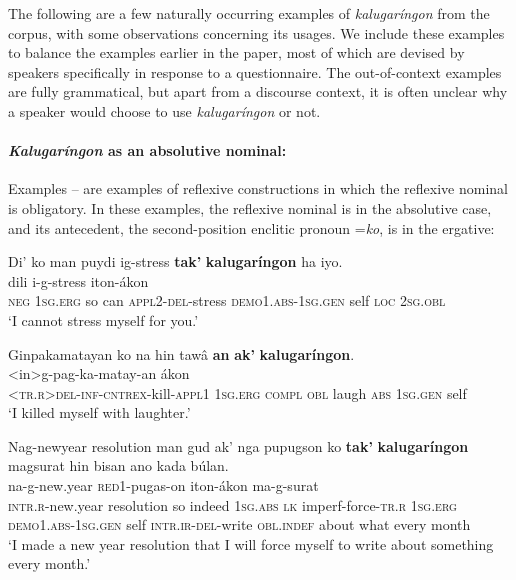 \documentclass[output=paper]{langscibook}
\begin{document}
The following are a few naturally occurring examples of \textit{kalugaríngon} from the corpus, with some observations concerning its usages. We include these examples to balance the examples earlier in the paper, most of which are devised by speakers specifically in response to a questionnaire. The out-of-context examples are fully grammatical, but apart from a discourse context, it is often unclear why a speaker would choose to use \textit{kalugaríngon} or not.

\paragraph*{{\textit{Kalugaríngon}} {as} {an} {absolutive} {nominal:}} Examples -- are examples of reflexive constructions in which the reflexive nominal is obligatory. In these examples, the reflexive nominal is in the absolutive case, and its antecedent, the second-position enclitic pronoun =\textit{ko}, is in the ergative:

\ea
\label{ex:Payne:37}
\glll
Di' ko man puydi ig-stress \textbf{tak'} \textbf{kalugaríngon}  ha iyo.\\
 dili { } { } { } i-g-stress iton-ákon { } { } { } \\
 \textsc{neg} 1\textsc{sg.erg} so can \textsc{appl2-del}-stress \textsc{demo1.abs-}1\textsc{sg.gen} self \textsc{loc} 2\textsc{sg.obl}\\
\glt ‘I cannot stress myself for you.'
\z

\ea
\label{ex:Payne:38}
\glll
 Ginpakamatayan ko na hin tawâ \textbf{an} \textbf{ak'} \textbf{kalugaríngon}.\\
<in>g-pag-ka-matay-an { } { } { } { } { } ákon { }\\
<\textsc{tr.r}>\textsc{del-inf-cntrex}{}-kill-\textsc{appl}1 1\textsc{sg.erg} \textsc{compl} \textsc{obl} laugh \textsc{abs} 1\textsc{sg.gen} self\textbf\\
\glt ‘I killed myself with laughter.'
\z

\ea
\label{ex:Payne:39}
\glll
Nag-newyear resolution man gud ak' nga pupugson ko \textbf{tak'} \textbf{kalugaríngon}  magsurat hin bisan ano kada búlan.\\
na-g-new.year { } { } { } { } { } \textsc{red}1-pugas-on { } iton-ákon {} ma-g-surat {} {} {} {} {}\\
\textsc{intr.r}{}-new.year resolution so indeed 1\textsc{sg.abs} \textsc{lk}  {imperf-}force-\textsc{tr.r} 1\textsc{sg.erg} \textsc{demo1.abs-}1\textsc{sg.gen} self \textsc{intr.ir-del}{}-write \textsc{obl.indef} about what every month\\
\glt ‘I made a new year resolution that I will force myself to write about something every month.'
\z
\end{document}
